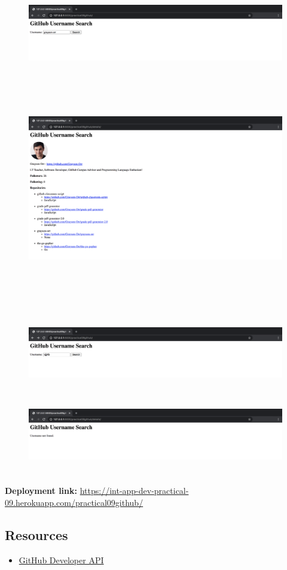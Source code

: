 \documentclass{article}
\begin{document}
\begin{figure}[H]
  \includegraphics[width=175mm, height=35mm]{./img/09-expected-github-2.png}
  \includegraphics[width=175mm, height=100mm]{./img/09-expected-github-3.png}
\end{figure}

\begin{figure}[H]
  \includegraphics[width=175mm, height=35mm]{./img/09-expected-github-4.png}
  \includegraphics[width=175mm, height=35mm]{./img/09-expected-github-5.png}
\end{figure}

\textbf{Deployment link:} \href{https://int-app-dev-practical-09.herokuapp.com/practical09github/}{https://int-app-dev-practical-09.herokuapp.com/practical09github/}

\subsection*{Resources} 
\begin{itemize}
  \item \href{https://developer.github.com/v3/}{GitHub Developer API}
\end{itemize}
\end{document}
